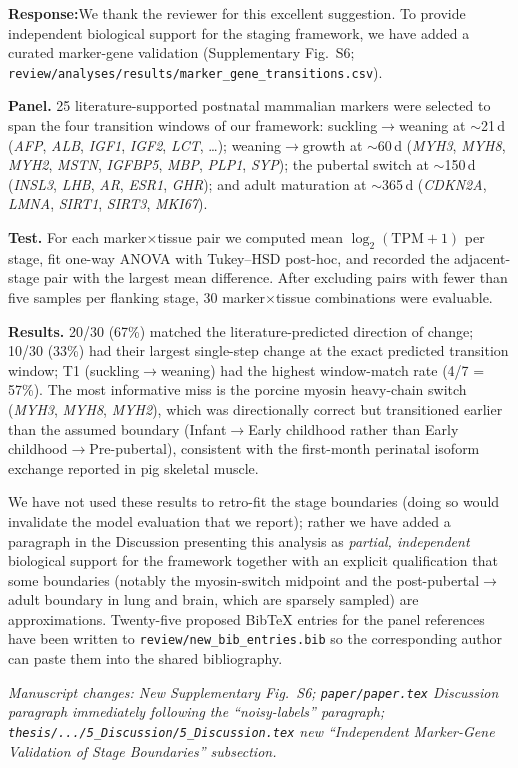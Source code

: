 \documentclass[11pt,a4paper]{article}
\newcommand{\response}[1]{%
  \par\vspace{2pt}\noindent\textbf{\textcolor{respcolor}{Response:}}\;\;#1\par\vspace{6pt}}
\newcommand{\changeloc}[1]{\par\noindent\textit{\small Manuscript changes: #1}\par}
\begin{document}
\response{We thank the reviewer for this excellent suggestion. To provide
independent biological support for the staging framework, we have added a
curated marker-gene validation (Supplementary Fig.~S6;
\texttt{review/analyses/results/marker\_gene\_transitions.csv}).

\textbf{Panel.} 25 literature-supported postnatal mammalian markers were
selected to span the four transition windows of our framework:
suckling$\rightarrow$weaning at $\sim$21\,d (\emph{AFP}, \emph{ALB},
\emph{IGF1}, \emph{IGF2}, \emph{LCT}, \dots); weaning$\rightarrow$growth
at $\sim$60\,d (\emph{MYH3}, \emph{MYH8}, \emph{MYH2}, \emph{MSTN},
\emph{IGFBP5}, \emph{MBP}, \emph{PLP1}, \emph{SYP}); the pubertal switch
at $\sim$150\,d (\emph{INSL3}, \emph{LHB}, \emph{AR}, \emph{ESR1},
\emph{GHR}); and adult maturation at $\sim$365\,d (\emph{CDKN2A},
\emph{LMNA}, \emph{SIRT1}, \emph{SIRT3}, \emph{MKI67}).

\textbf{Test.} For each marker$\times$tissue pair we computed mean
$\log_2(\mathrm{TPM}+1)$ per stage, fit one-way ANOVA with Tukey--HSD
post-hoc, and recorded the adjacent-stage pair with the largest mean
difference. After excluding pairs with fewer than five samples per
flanking stage, 30 marker$\times$tissue combinations were evaluable.

\textbf{Results.} 20/30 (67\%) matched the literature-predicted direction
of change; 10/30 (33\%) had their largest single-step change at the
exact predicted transition window; T1 (suckling$\rightarrow$weaning)
had the highest window-match rate (4/7 = 57\%). The most informative
miss is the porcine myosin heavy-chain switch (\emph{MYH3}, \emph{MYH8},
\emph{MYH2}), which was directionally correct but transitioned earlier
than the assumed boundary (Infant$\rightarrow$Early childhood rather
than Early childhood$\rightarrow$Pre-pubertal), consistent with the
first-month perinatal isoform exchange reported in pig skeletal muscle.

We have not used these results to retro-fit the stage boundaries
(doing so would invalidate the model evaluation that we report); rather
we have added a paragraph in the Discussion presenting this analysis as
\emph{partial, independent} biological support for the framework
together with an explicit qualification that some boundaries (notably
the myosin-switch midpoint and the post-pubertal$\rightarrow$adult
boundary in lung and brain, which are sparsely sampled) are
approximations. Twenty-five proposed BibTeX entries for the panel
references have been written to \texttt{review/new\_bib\_entries.bib} so
the corresponding author can paste them into the shared bibliography.}
\changeloc{New Supplementary Fig.~S6; \texttt{paper/paper.tex} Discussion
paragraph immediately following the ``noisy-labels'' paragraph;
\texttt{thesis/.../5\_Discussion/5\_Discussion.tex} new
``Independent Marker-Gene Validation of Stage Boundaries'' subsection.}
\end{document}
